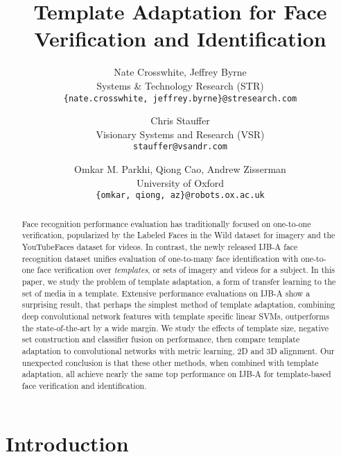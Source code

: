 \documentclass[10pt,twocolumn,letterpaper]{article}
\theoremstyle{definition}		\newtheorem{defn}[thm]{Definition}
\begin{document}
\title{Template Adaptation for Face Verification and Identification}

\author{
Nate Crosswhite, Jeffrey Byrne \\
Systems \& Technology Research (STR) \\
{\tt\small \{nate.crosswhite, jeffrey.byrne\}@stresearch.com}
\and
Chris Stauffer  \\
Visionary Systems and Research (VSR) \\
{\tt\small stauffer@vsandr.com}
\and
Omkar M. Parkhi, Qiong Cao, Andrew Zisserman  \\
University of Oxford \\
{\tt\small \{omkar, qiong, az\}@robots.ox.ac.uk}
}

\maketitle



\begin{abstract}
Face recognition performance evaluation has traditionally focused on one-to-one verification, popularized by the Labeled Faces in the Wild dataset \cite{Huang07} for imagery and the YouTubeFaces dataset \cite{Wolf11} for videos. In contrast, the newly released IJB-A face recognition dataset \cite{Klare15} unifies evaluation of one-to-many face identification with one-to-one face verification over {\em templates}, or sets of imagery and videos for a subject.  In this paper, we study the problem of template adaptation, a form of transfer learning to the set of media in a template.  Extensive performance evaluations on IJB-A show a surprising result, that perhaps the simplest method of template adaptation, combining deep convolutional network features with template specific linear SVMs, outperforms the state-of-the-art by a wide margin.  We study the effects of template size, negative set construction and classifier fusion on performance, then compare template adaptation to convolutional networks with metric learning, 2D and 3D alignment.  Our unexpected conclusion is that these other methods, when combined with template adaptation, all achieve nearly the same top performance on IJB-A for template-based face verification and identification.  
\end{abstract}







\section{Introduction}
\end{document}
